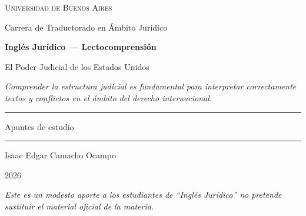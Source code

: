 \documentclass[12pt,oneside]{book}
\newcommand{\universidad}{Universidad de Buenos Aires}
\newcommand{\carrera}{Carrera de Traductorado en Ámbito Jurídico}
\newcommand{\materia}{Inglés Jurídico --- Lectocomprensión}
\newcommand{\titulo}{El Poder Judicial de los Estados Unidos}
\newcommand{\autor}{Isaac Edgar Camacho Ocampo}
\newcommand{\anio}{2026}
\begin{document}
\begin{titlepage}

\thispagestyle{empty}

\begin{center}

\vspace*{1cm}

{\large \textsc{\universidad}}

\vspace{0.2cm}

{\large \carrera}

\vspace{3cm}

{\Huge \textbf{\materia}}

\vspace{1cm}

{\LARGE \titulo}

\vspace{0.8cm}

\textit{Comprender la estructura judicial es fundamental para interpretar correctamente textos y conflictos en el ámbito del derecho internacional.}

\vspace{1.2cm}

\rule{0.70\textwidth}{0.5pt}

\vspace{0.5cm}

{\large Apuntes de estudio}

\vspace{0.5cm}

\rule{0.70\textwidth}{0.5pt}

\vfill

{\large \autor}

\vspace{0.3cm}

{\large \anio}

\end{center}

\vfill

\begin{flushleft}
\textit{Este es un modesto aporte a los estudiantes de ``Inglés Jurídico'' no pretende sustituir el material oficial de la materia.}
\end{flushleft}

\end{titlepage}

\tableofcontents

\newpage
\end{document}
